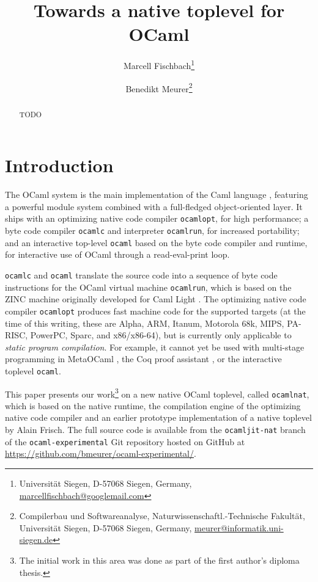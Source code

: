 \documentclass[10pt,a4paper,draft,twocolumn]{article}
\begin{document}
\title{%
  Towards a native toplevel for OCaml
}
\author{%
  Marcell Fischbach\thanks{
    Universit\"at Siegen,
    D-57068 Siegen,
    Germany,
    \url{marcellfischbach@googlemail.com}
  }
  \and
  Benedikt Meurer\thanks{
    Compilerbau und Softwareanalyse,
    Naturwissenschaftl.-Technische Fakult\"at,
    Universit\"at Siegen,
    D-57068 Siegen,
    Germany,
    \url{meurer@informatik.uni-siegen.de}
  }
}
\date{}

\maketitle

\begin{abstract}
  TODO
\end{abstract}


\section{Introduction}

The OCaml \cite{Leroy11,Remy02} system is the main implementation of the Caml
language \cite{Caml11}, featuring a powerful module system
combined with a full-fledged object-oriented layer. It ships with an optimizing native
code compiler \texttt{ocamlopt}, for high performance; a byte code compiler \texttt{ocamlc}
and interpreter \texttt{ocamlrun}, for increased portability; and an interactive top-level
\texttt{ocaml} based on the byte code compiler and runtime, for interactive use of OCaml
through a read-eval-print loop.

\texttt{ocamlc} and \texttt{ocaml} translate the source code into a sequence of byte code
instructions for the OCaml virtual machine \texttt{ocamlrun}, which is based on the ZINC
machine \cite{Leroy90} originally developed for Caml Light \cite{Leroy02}. The optimizing
native code compiler \texttt{ocamlopt} produces fast machine code for the supported targets
(at the time of this writing, these are Alpha, ARM, Itanum, Motorola 68k, MIPS, PA-RISC, PowerPC,
Sparc, and x86/x86-64), but is currently only applicable to \emph{static program compilation}.
For example, it cannot yet be used with multi-stage programming in MetaOCaml \cite{Taha03,Taha06},
the Coq proof assistant \cite{Bertot04,Coq10}, or the interactive toplevel \texttt{ocaml}.

This paper presents our work\footnote{The initial work in this area was done as part of the first
author's diploma thesis.} on a new native OCaml toplevel, called \texttt{ocamlnat}, which is
based on the native runtime, the compilation engine of the optimizing native code compiler and
an earlier prototype implementation of a native toplevel by Alain Frisch. The full source code
is available from the \texttt{ocamljit-nat} branch of the \texttt{ocaml-experimental} Git
repository hosted on GitHub at \url{https://github.com/bmeurer/ocaml-experimental/}.
\end{document}
